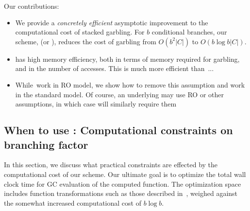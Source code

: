 \medskip
Our contributions:
\begin{itemize}
	\item We provide a {\em concretely efficient}  asymptotic  improvement to the computational cost of stacked garbling.  For $b$ conditional branches, our scheme, \ourschemelong (or \ourscheme),  reduces the cost of garbling  from $O(b^2|C|)$ to $O(b \log b |C|)$. 
	\item \ourschemelong has high memory efficiency, both in terms of memory required for garbling, and in the number of accesses.   This is much more efficient than~\HK... 
	\item While~\HK work in RO model, we show how to remove this assumption and work in the standard model. Of course, an underlying \underscheme may use RO or other assumptions, in which case \ourschemelong will similarly require them
\end{itemize}














\subsection{When to use \ourscheme: Computational constraints on branching factor}
\label{sec:whentouse}

In this section, we discuss what practical constraints are effected by the computational cost of our scheme.  
Our ultimate goal is to optimize the total wall clock time for GC evaluation of the computed function.  The optimization space includes function transformations such as those described in~, weighed against the somewhat increased computational cost of $b\log b$.


